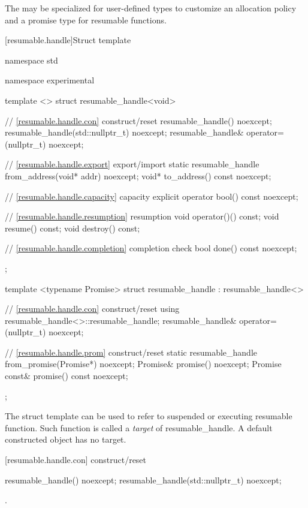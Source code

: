 \pnum
The  may be specialized for user-defined types 
to customize an allocation policy and a promise type for resumable functions.


[resumable.handle]{Struct template }

%
\begin{codeblock}
namespace std {
  namespace experimental {
    template <>
    struct resumable_handle<void>
    {
      // \ref{resumable.handle.con} construct/reset
      resumable_handle() noexcept;		
      resumable_handle(std::nullptr_t) noexcept;
      resumable_handle& operator=(nullptr_t) noexcept;
      
      // \ref{resumable.handle.export} export/import
      static resumable_handle from_address(void* addr) noexcept;		
      void* to_address() const noexcept;
      
      // \ref{resumable.handle.capacity} capacity
      explicit operator bool() const noexcept;
      
      // \ref{resumable.handle.resumption} resumption
      void operator()() const;
      void resume() const;	
      void destroy() const;
      
      // \ref{resumable.handle.completion} completion check
      bool done() const noexcept; 
    };
    
    template <typename Promise>
    struct resumable_handle : resumable_handle<>
    {
      // \ref{resumable.handle.con} construct/reset
      using resumable_handle<>::resumable_handle;
      resumable_handle& operator=(nullptr_t) noexcept;
      
      // \ref{resumable.handle.prom} construct/reset
      static resumable_handle from_promise(Promise*) noexcept;		
      Promise& promise() noexcept;		
      Promise const& promise() const noexcept;
    };
  }
}
\end{codeblock}

\pnum
The struct template 
can be used to refer to suspended or executing resumable function.
Such function is called a \textit{target} of resumable_handle.
A default constructed  object has no target.


[resumable.handle.con]{ construct/reset}
\begin{itemdecl}
  resumable_handle() noexcept;		
  resumable_handle(std::nullptr_t) noexcept;
\end{itemdecl}
\begin{itemdescr}
  \pnum\postconditions {}.
\end{itemdescr}

